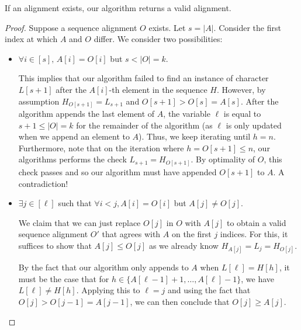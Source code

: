 \documentclass{article}
\begin{document}
\begin{lemma}
   If an alignment exists, our algorithm returns a valid alignment. 
\end{lemma}
\begin{proof}
  Suppose a sequence alignment $O$ exists. Let $s = |A|$. Consider the first index at which $A$ and $O$ differ. We consider two possibilities:
  \begin{itemize}
    \item $\forall i \in [s], \, A[i] = O[i]$ but $s < |O| = k$.
      
      This implies that our algorithm failed to find an instance of character $L[s + 1]$ after the $A[i]$-th element in the sequence $H$. However, by assumption $H_{O[s + 1]} = L_{ s + 1 }$ and $O[s + 1] > O[s] = A[s]$. After the algorithm appends the last element of $A$, the variable $\ell$ is equal to $s + 1 \le |O| = k$ for the remainder of the algorithm (as $\ell$ is only updated when we append an element to $A$). Thus, we keep iterating until $h = n$. Furthermore, note that on the iteration where $h = O[s + 1] \le n$, our algorithms performs the check $L_{s + 1} = H_{O[s + 1]}$. By optimality of $O$, this check passes and so our algorithm must have appended $O[s + 1]$ to $A$. A contradiction! \Lightning

    \item $\exists j \in [\ell]$ such that $\forall i < j, A[i] = O[i]$ but $A[j] \ne O[j]$.

      We claim that we can just replace $O[j]$ in $O$ with $A[j]$ to obtain a valid sequence alignment $O'$ that agrees with $A$ on the first $j$ indices. For this, it suffices to show that $A[j] \le O[j]$ as we already know $H_{A[j]} = L_j = H_{O[j]}$. 

      By the fact that our algorithm only appends to $A$ when $L[\ell] = H[h]$, it must be the case that for $h \in \{A[\ell - 1] + 1, \hdots, A[\ell] - 1\}$, we have $L[\ell] \ne H[h]$. Applying this to $\ell = j$ and using the fact that $O[j] > O[j - 1] = A[j - 1]$, we can then conclude that $O[j] \ge A[j]$.

  \end{itemize}
\end{proof}
\end{document}
